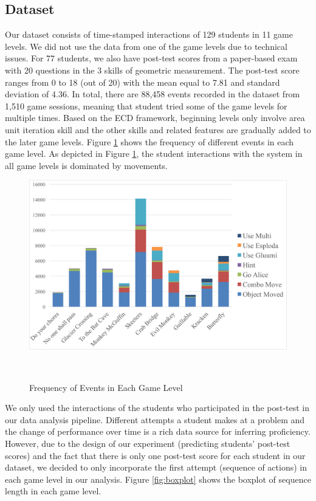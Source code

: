 \documentclass{sigchi}
\begin{document}
\subsection{Dataset} 
Our dataset consists of time-stamped interactions of 129 students in 11 game levels.
We did not use the data from one of the game levels due to technical issues.
For 77 students, we also have post-test scores from a paper-based exam with 20 questions in the 3 skills of geometric measurement.
The post-test score ranges from 0 to 18 (out of 20) with the mean equal to 7.81 and standard deviation of 4.36. 
In total, there are 88,458 events recorded in the dataset from 1,510 game sessions, meaning that student tried some of the game levels for multiple times.
Based on the ECD framework, beginning levels only involve area unit iteration skill and the other skills and related features are gradually added to the later game levels.
Figure \ref{fig:frequency} shows the frequency of different events in each game level. As depicted in Figure \ref{fig:frequency}, the student interactions with the system in all game levels is dominated by movements.

\begin{figure}
	\centering
	\includegraphics[width=0.9\columnwidth]{figures/frequency.pdf}
	\caption{Frequency of Events in Each Game Level}~\label{fig:frequency}
\end{figure}

We only used the interactions of the students who participated in the post-test in our data analysis pipeline.
Different attempts a student makes at a problem and the change of performance over time is a rich data source for inferring proficiency.
However, due to the design of our experiment (predicting students' post-test scores) and the fact that there is only one post-test score for each student in our dataset, we decided to  only incorporate the first attempt (sequence of actions) in each game level in our analysis. Figure \ref{fig:boxplot} shows the boxplot of sequence length in each game level. 
\end{document}
